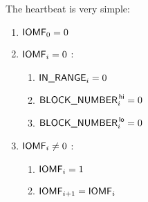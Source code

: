 The heartbeat is very simple:
\begin{enumerate}
	\item $\textsf{IOMF}_{0} = 0$
	\item \If $\textsf{IOMF}_{i} = 0$ \Then:
	\begin{enumerate}
		\item $\textsf{IN\_RANGE} _{i} = 0$
		\item $\textsf{BLOCK\_NUMBER}^{\mathsf{\,hi}}_{i}=0$ 
		\item $\textsf{BLOCK\_NUMBER}^{\mathsf{\,lo}}_{i}=0$  
	\end{enumerate}
	\item \If $\textsf{IOMF}_{i} \neq 0$ \Then:
	\begin{enumerate}
		\item $\textsf{IOMF} _{i} = 1$
		\item $\textsf{IOMF}_{i+1} = \textsf{IOMF}_{i}$
	\end{enumerate}
\end{enumerate}
